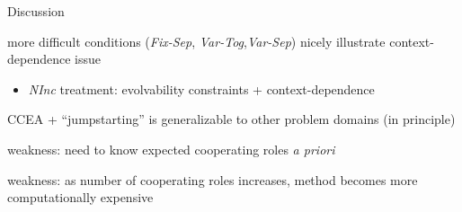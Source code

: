 \begin{frame}{Discussion}

more difficult conditions (\textit{Fix-Sep}, \textit{Var-Tog},\textit{Var-Sep}) nicely illustrate context-dependence issue
\begin{itemize}
\item \textit{NInc} treatment: evolvability constraints + context-dependence
\end{itemize}

CCEA + ``jumpstarting'' is generalizable to other problem domains (in principle)

weakness: need to know expected cooperating roles \textit{a priori}

weakness: as number of cooperating roles increases, method becomes more computationally expensive

\end{frame}
